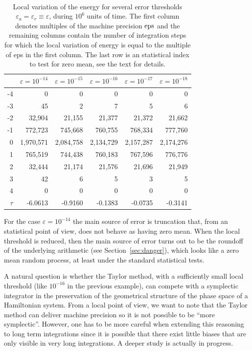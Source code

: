 \documentclass[12pt,twoside]{article}
\newcommand{\eps}{\mbox{\rm eps}}
\begin{document}
\begin{table}
\begin{center}
{\tt\small
\begin{tabular}{|r|r|r|r|r|r|}\hline
    & $\varepsilon=10^{-14}$ & $\varepsilon=10^{-15}$ &
      $\varepsilon=10^{-16}$ & $\varepsilon=10^{-17}$ &
       $\varepsilon=10^{-18}$\\ \hline
 -4 &         0 &         0 &         0 &         0 &         0\\
 -3 &        45 &         2 &         7 &         5 &         6\\
 -2 &    32,904 &    21,155 &    21,377 &    21,372 &    21,662\\
 -1 &   772,723 &   745,668 &   760,755 &   768,334 &   777,760\\
  0 & 1,970,571 & 2,084,758 & 2,134,729 & 2,157,287 & 2,174,276\\
  1 &   765,519 &   744,438 &   760,183 &   767,596 &   776,776\\
  2 &    32,444 &    21,174 &    21,576 &    21,696 &    21,949\\
  3 &        42 &         6 &         5 &         3 &         5\\
  4 &         0 &         0 &         0 &         0 &         0\\ \hline
$\tau$& -6.0613 &   -0.9160 &   -0.1383 &   -0.0735 &   -0.3141\\ \hline
\end{tabular}
}
\end{center}
\caption{Local variation of the energy for several error thresholds
$\varepsilon_a=\varepsilon_r\equiv\varepsilon$, during $10^6$ units of
time. The first column denotes multiples of the machine precision
$\eps$ and the remaining columns contain the number of integration
steps for which the local variation of energy is equal to the multiple
of eps in the first column. The last row is an statistical index to
test for zero mean, see the text for details.}
\label{tau:e-lo}
\end{table}

For the case $\varepsilon=10^{-14}$ the main source of error is
truncation that, from an statistical point of view, does not behave as
having zero mean. When the local threshold is reduced, then the main
source of error turns out to be the roundoff of the underlying
arithmetic (see Section~\ref{sec:danger}), which looks like a zero
mean random process, at least under the standard statistical tests.

A natural question is whether the Taylor method, with a sufficiently
small local threshold (like $10^{-16}$ in the previous example), can
compete with a symplectic integrator in the preservation of the
geometrical structure of the phase space of a Hamiltonian system.
From a local point of view, we want to note that the Taylor method can
deliver machine precision so it is not possible to be ``more
symplectic''. However, one has to be more careful when extending this
reasoning to long term integrations since it is possible that there
exist little biases that are only visible in very long integrations. A
deeper study is actually in progress.
\end{document}
